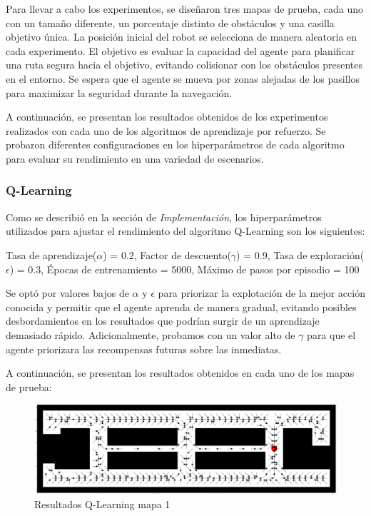 \documentclass[conference,a4paper]{IEEEtran}
\begin{document}
Para llevar a cabo los experimentos, se diseñaron tres mapas de prueba, cada uno con un tamaño diferente, un porcentaje distinto de obstáculos y 
una casilla objetivo única. La posición inicial del robot se selecciona de manera aleatoria en cada experimento. 
El objetivo es evaluar la capacidad del agente para planificar una ruta segura hacia el objetivo, evitando colisionar con los obstáculos presentes en el entorno. 
Se espera que el agente se mueva por zonas alejadas de los pasillos para maximizar la seguridad durante la navegación.\newline

A continuación, se presentan los resultados obtenidos de los experimentos realizados con cada uno de los algoritmos de aprendizaje por refuerzo. Se probaron diferentes configuraciones en los hiperparámetros de cada algoritmo para evaluar su rendimiento en una variedad de escenarios.\newline

\subsubsection{\textbf{Q-Learning}}

Como se describió en la sección de \textit{Implementación}, los hiperparámetros utilizados para ajustar el rendimiento del algoritmo Q-Learning son los siguientes:\newline

Tasa de aprendizaje($\alpha$) = 0.2, Factor de descuento($\gamma$) = 0.9, Tasa de exploración($\epsilon$) = 0.3,  Épocas de entrenamiento = 5000, Máximo de pasos por episodio = 100\newline

Se optó por valores bajos de $\alpha$ y $\epsilon$ para priorizar la explotación de la mejor acción conocida y permitir que el agente aprenda de manera gradual, evitando posibles desbordamientos en los resultados que podrían surgir de un aprendizaje demasiado rápido.
Adicionalmente, probamos con un valor alto de $\gamma$ para que el agente priorizara las recompensas futuras sobre las inmediatas.\newline

A continuación, se presentan los resultados obtenidos en cada uno de los mapas de prueba:

\begin{figure}[h]
  \centering
  \includegraphics[scale=0.38]{resultado_qlearning_mapa_1}
  \caption{Resultados Q-Learning mapa 1}
  \label{fig:resultado_qlearning_mapa_1}
\end{figure}
\end{document}

